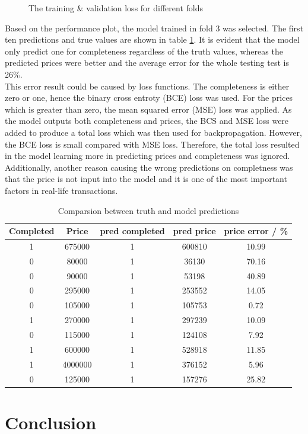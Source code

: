 \documentclass[12pt,twoside]{report}
\begin{document}
\begin{figure}[h]
	\hfil
	\caption{The training \& validation loss for different folds}
	\label{sale_fold_5}
\end{figure}

Based on the performance plot, the model trained in fold 3 was selected. The first ten predictions and true values are shown in table \ref{first_model_predictions}. It is evident that the model only predict one for completeness regardless of the truth values, whereas the predicted prices were better and the average error for the whole testing test is 26\%.  
\\

This error result could be caused by loss functions. The completeness is either zero or one, hence the binary cross entroty (BCE) loss was used. For the prices which is greater than zero, the mean squared error (MSE) loss was applied. As the model outputs both completeness and prices, the BCS and MSE loss were added to produce a total loss which was then used for backpropagation. However, the BCE loss is small compared with MSE loss. Therefore, the total loss resulted in the model learning more in predicting prices and completeness was ignored. Additionally, another reason causing the wrong predictions on completness was that the price is not input into the model and it is one of the most important factors in real-life transactions. 
\begin{table}[h]
	\centering
	\caption{Comparsion between truth and model predictions}
	\label{first_model_predictions}
	\begin{tabular}{| c | c | c | c | c |}
		\hline
		Completed & Price & pred completed & pred price & price error  / \%\\ 
		\hline
		1 & 675000 & 1 & 600810 & 10.99 \\
		\hline
		0 & 80000 & 1 & 36130 & 70.16 \\
		\hline
		0 & 90000 & 1 & 53198 & 40.89  \\
		\hline
		0 & 295000 & 1 & 253552 & 14.05  \\
		\hline
		0 & 105000 & 1 & 105753 & 0.72  \\ 
		\hline
		1 & 270000 & 1 & 297239 & 10.09  \\
		\hline
		0 & 115000 & 1 & 124108 & 7.92  \\
		\hline
		1 & 600000 & 1 & 528918 & 11.85  \\
		\hline
		1 & 4000000 & 1 & 376152 & 5.96  \\
		\hline
		0 & 125000 & 1 & 157276 & 25.82  \\
		\hline
	\end{tabular}
\end{table}

\chapter{Conclusion}




\end{document}
